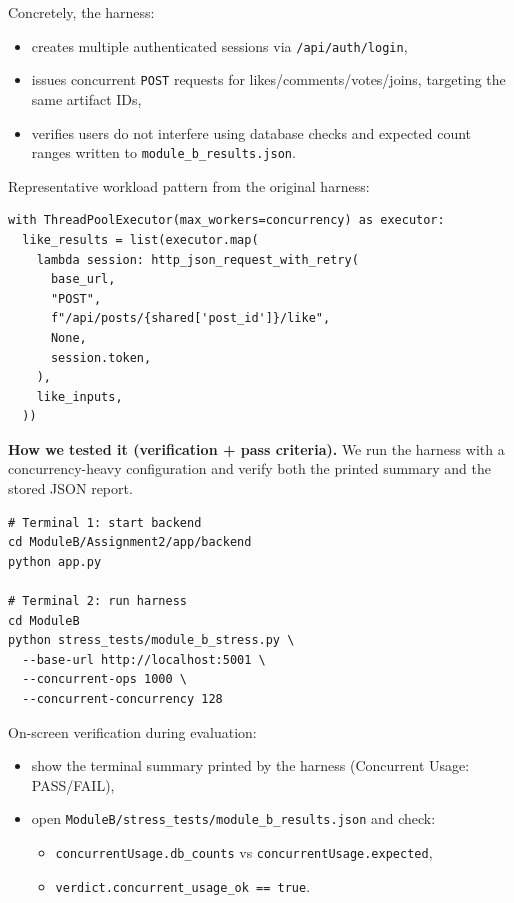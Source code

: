 \documentclass[12pt,a4paper]{article}
\begin{document}
Concretely, the harness:
\begin{itemize}[noitemsep]
  \item creates multiple authenticated sessions via \texttt{/api/auth/login},
  \item issues concurrent \texttt{POST} requests for likes/comments/votes/joins, targeting the same artifact IDs,
  \item verifies users do not interfere using database checks and expected count ranges written to \texttt{module\_b\_results.json}.
\end{itemize}

Representative workload pattern from the original harness:
\begin{lstlisting}[style=python, caption={Concurrent API writes in module\_b\_stress.py (representative)}]
with ThreadPoolExecutor(max_workers=concurrency) as executor:
  like_results = list(executor.map(
    lambda session: http_json_request_with_retry(
      base_url,
      "POST",
      f"/api/posts/{shared['post_id']}/like",
      None,
      session.token,
    ),
    like_inputs,
  ))
\end{lstlisting}

\textbf{How we tested it (verification + pass criteria).}
We run the harness with a concurrency-heavy configuration and verify both the printed summary and the stored JSON report.

\begin{lstlisting}[basicstyle=\ttfamily\small, caption={Concurrent-usage test run command (Module B)}]
# Terminal 1: start backend
cd ModuleB/Assignment2/app/backend
python app.py

# Terminal 2: run harness
cd ModuleB
python stress_tests/module_b_stress.py \
  --base-url http://localhost:5001 \
  --concurrent-ops 1000 \
  --concurrent-concurrency 128
\end{lstlisting}

On-screen verification during evaluation:
\begin{itemize}[noitemsep]
  \item show the terminal summary printed by the harness (Concurrent Usage: PASS/FAIL),
  \item open \texttt{ModuleB/stress\_tests/module\_b\_results.json} and check:
    \begin{itemize}[noitemsep]
      \item \texttt{concurrentUsage.db\_counts} vs \texttt{concurrentUsage.expected},
      \item \texttt{verdict.concurrent\_usage\_ok == true}.
    \end{itemize}
\end{itemize}
\end{document}
